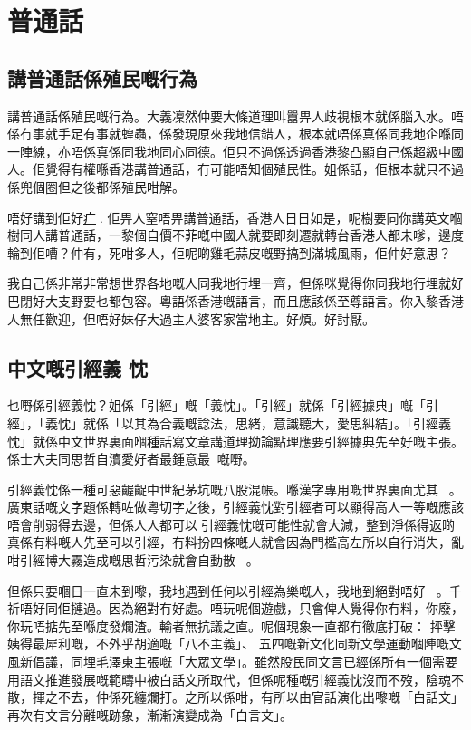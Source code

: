 \chapter{普通話}

\section{講普通話係殖民嘅行為}
講普通話係殖民嘅行為。大義凜然仲要大條道理叫囂畀人歧視根本就係腦入水。唔係冇事就手足有事就蝗蟲，係發現原來我地信錯人，根本就唔係真係同我地企喺同一陣線，亦唔係真係同我地同心同德。佢只不過係透過香港黎凸顯自己係超級中國人。佢覺得有權喺香港講普通話，冇可能唔知個殖民性。姐係話，佢根本就只不過係兜個圈但之後都係殖民咁解。

唔好講到佢好\ul{疒}{}. 佢畀人窒唔畀講普通話，香港人日日如是，呢樹要同你講英文嗰樹同人講普通話，一黎個自價不菲嘅中國人就要即刻遷就轉台香港人都未嗲，邊度輪到佢嘈？仲有，死咁多人，佢呢啲雞毛蒜皮嘅野搞到滿城風雨，佢仲好意思？

我自己係非常非常想世界各地嘅人同我地行埋一齊，但係咪覺得你同我地行埋就好巴閉好大支野要乜都包容。粵語係香港嘅語言，而且應該係至尊語言。你入黎香港人無任歡迎，但唔好妹仔大過主人婆客家當地主。好煩。好討厭。


\section{中文嘅引經義 忱}

乜嘢係引經義忱？姐係「引經」嘅「義忱」。「引經」就係「引經據典」嘅「引經」，「義忱」就係「以其為合義嘅諗法，思緒，意識聽大，愛思糾結」。「引經義忱」就係中文世界裏面嗰種話寫文章講道理拗論點理應要引經據典先至好嘅主張。係士大夫同思哲自瀆愛好者最鍾意最󰹞󱥡嘅嘢。

引經義忱係一種可惡齷齪中世紀茅坑嘅八股混帳。喺漢字專用嘅世界裏面尤其。廣東話嘅文字題係轉咗做粵切字之後，引經義忱對引經者可以顯得高人一等嘅應該唔會削弱得去邊，但係人人都可以󰇞引經義忱嘅可能性就會大減，整到淨係得返啲真係有料嘅人先至可以引經，冇料扮四條嘅人就會因為門檻高左所以自行消失，亂咁引經博大霧造成嘅思哲污染就會自動散󱎦󰐢。

但係只要嗰日一直未到嚟，我地遇到任何以引經為樂嘅人，我地到絕對唔好。千祈唔好同佢摙過。因為絕對冇好處。唔玩呢個遊戲，只會俾人覺得你冇料，你廢，你玩唔掂先至喺度發爛渣。輸者無抗議之直。呢個現象一直都冇徹底打破： 抨擊姨得最犀利嘅，不外乎胡適嘅「八不主義」、 五四嘅新文化同新文學運動嗰陣嘅文風新倡議，同埋毛澤東主張嘅「大眾文學」。雖然股民同文言已經係所有一個需要用語文推進發展嘅範疇中被白話文所取代，但係呢種嘅引經義忱沒而不歿，陰魂不散，揮之不去，仲係死纏爛打。之所以係咁，有所以由官話演化出嚟嘅「白話文」再次有文言分離嘅跡象，漸漸演變成為「白言文」。


